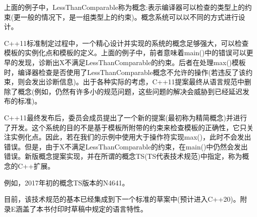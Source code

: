 上面的例子中，LessThanComparable称为概念:表示编译器可以检查的类型上的约束(更一般的情况下，是一组类型上的约束)。概念系统可以以不同的方式进行设计。

C++11标准制定过程中，一个精心设计并实现的系统的概念足够强大，可以检查模板的实例化点和模板的定义。上面的例子中，前者意味着main()中的错误可以更早的发现，诊断出X不满足LessThanComparable的约束。后者在处理max()模板时，编译器检查是否使用了LessThanComparable概念不允许的操作(若违反了该约束，则会发出诊断信息)。出于各种实际的考虑，C++11提案最终从语言规范中删除了概念(例如，仍然有许多小的规范问题，这些问题的解决会威胁到已经延迟发布的标准)。

C++11最终发布后，委员会成员提出了一个新的提案(最初称为精简概念)并进行了开发。这个系统的目的不是基于模板所附带的约束来检查模板的正确性，它只关注实例化点。因此，若在我们的示例中使用大于操作符实现max()，此时不会发出错误。但是，由于X不满足LessThanComparable的约束，在main()中仍然会发出错误。新版概念提案实现，并在所谓的概念TS(TS代表技术规范)中指定，称为概念的C++扩展。

\begin{notice}
例如，2017年初的概念TS版本的N4641。
\end{notice}

目前，该技术规范的基本已经集成到下一个标准的草案中(预计进入C++20)。附录E涵盖了本书付印时草稿中规定的语言特性。














































